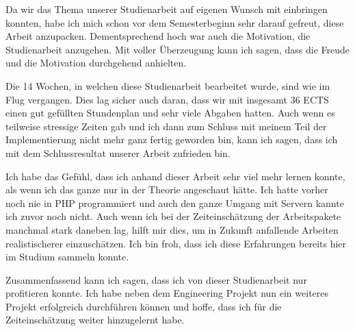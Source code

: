 
Da wir das Thema unserer Studienarbeit auf eigenen Wunsch mit einbringen konnten, habe ich mich schon vor dem Semesterbeginn sehr darauf gefreut, diese Arbeit anzupacken. Dementsprechend hoch war auch die Motivation, die Studienarbeit anzugehen. Mit voller Überzeugung kann ich sagen, dass die Freude und die Motivation durchgehend anhielten. 

\bigskip

Die 14 Wochen, in welchen diese Studienarbeit bearbeitet wurde, sind wie im Flug vergangen. Dies lag sicher auch daran, dass wir mit insgesamt 36 ECTS einen gut gefüllten Stundenplan und sehr viele Abgaben hatten.
Auch wenn es teilweise stressige Zeiten gab und ich dann zum Schluss mit meinem Teil der Implementierung nicht mehr ganz fertig geworden bin, kann ich sagen, dass ich mit dem Schlussresultat unserer Arbeit zufrieden bin.

\bigskip

Ich habe das Gefühl, dass ich anhand dieser Arbeit sehr viel mehr lernen konnte, als wenn ich das ganze nur in der Theorie angeschaut hätte. Ich hatte vorher noch nie in PHP programmiert und auch den ganze Umgang mit Servern kannte ich zuvor noch nicht. Auch wenn ich bei der Zeiteinschätzung der Arbeitspakete manchmal stark daneben lag, hilft mir dies, um in Zukunft anfallende Arbeiten realistischerer einzuschätzen. Ich bin froh, dass ich diese Erfahrungen bereits hier im Studium sammeln konnte.

\bigskip
Zusammenfassend kann ich sagen, dass ich von dieser Studienarbeit nur profitieren konnte. Ich habe neben dem Engineering Projekt nun ein weiteres Projekt erfolgreich durchführen können und hoffe, dass ich für die Zeiteinschätzung weiter hinzugelernt habe.
